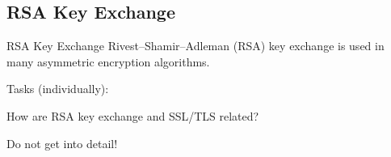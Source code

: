 ﻿\subsection{RSA Key Exchange}

\begin{frame}{RSA Key Exchange}
  \alert{Rivest–Shamir–Adleman (RSA)} key exchange is used in many \alert{asymmetric} encryption algorithms.
  \begin{exampleblock}{Tasks (individually):}
    \begin{description}[???]
        \item [???] How are \alert{RSA} key exchange and SSL/TLS related?
        \begin{description}
            \item [$\Rightarrow$ Hint:] Do not get into detail!
        \end{description}
    \end{description}
  \end{exampleblock}
\end{frame}
